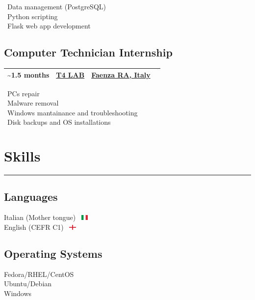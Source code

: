\documentclass{article}
\newcommand{\event}[3]{
    \begin{tabularx}{\linewidth}{| >{\raggedright\arraybackslash}X >{\centering\arraybackslash}X >{\raggedleft\arraybackslash}X |}
        \hline
        #1 & #2 & #3 \\
        \hline
    \end{tabularx}
    \vspace{-10pt}
}
\let\oldsection\section
\renewcommand{\section}[1]{
    \oldsection*{#1}
    \vspace{-20pt}
    \rule{\linewidth}{2pt}
    \vspace{-30pt}
}
\let\oldsubsection\subsection
\renewcommand{\subsection}[1]{
    \oldsubsection*{#1}
    \vspace{-5pt}
}
\begin{document}
\begin{paracol}{2}
    \noindent
    \faDatabase \ Data management (PostgreSQL) \\
    \faPython \ Python scripting \\
    \faFlask \ Flask web app development

    \subsection{Computer Technician Internship}
    \event
        {\faCalendar* 2017 \textasciitilde 1.5 months}
        {\href{https://www.t4lab.it/}{T4 LAB}}
        {\href{https://www.openstreetmap.org/relation/43004}{Faenza RA, Italy} \ \faCity}

    \noindent
    \faLaptop \ PCs repair \\
    \faShieldVirus \ Malware removal \\
    \faRecycle \ Windows mantainance and troubleshooting \\
    \faHdd \ Disk backups and OS installations


    \switchcolumn
    \flushright

    \section{Skills \ \faLightbulb}

    \subsection{Languages}
    Italian (Mother tongue) \ \includegraphics[width=10pt]{it} \\
    English (CEFR C1) \ \includegraphics[width=10pt]{gb-eng}

    \subsection{Operating Systems}
    Fedora/RHEL/CentOS \ \textcolor[HTML]{EE0000}{\faRedhat} \\
    Ubuntu/Debian \ \textcolor[HTML]{E95420}{\faUbuntu} \\
    Windows \ \textcolor[HTML]{0078D6}{\faWindows}


\end{paracol}
\end{document}
